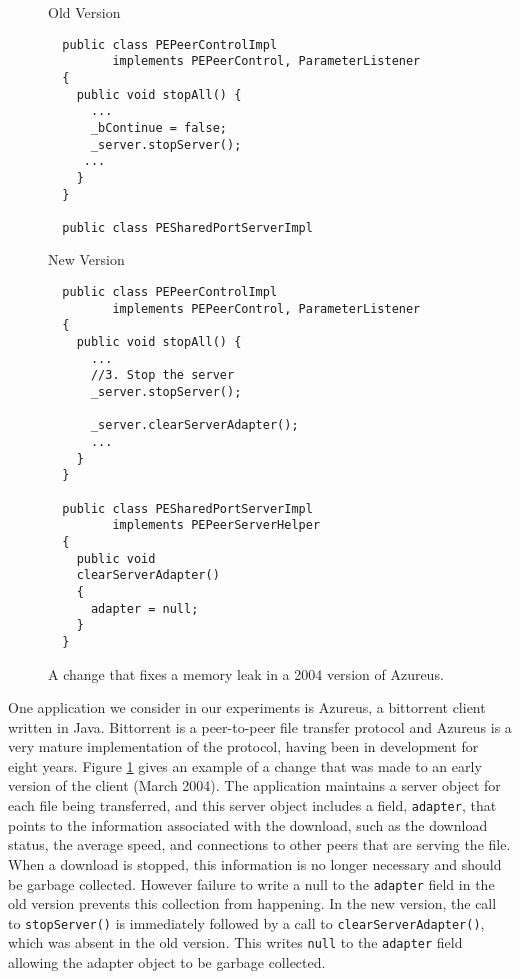 \begin{figure}
\begin{minipage}{\textwidth/2}
\begin{center}
Old Version
\end{center}
\begin{verbatim}
  public class PEPeerControlImpl
         implements PEPeerControl, ParameterListener
  {
    public void stopAll() {
      ...
      _bContinue = false;
      _server.stopServer();
     ...
    }
  }

  public class PESharedPortServerImpl

\end{verbatim}
\end{minipage}
\begin{minipage}{\textwidth/2}
\begin{center}
New Version
\end{center}
\begin{verbatim}
  public class PEPeerControlImpl
         implements PEPeerControl, ParameterListener
  {
    public void stopAll() {
      ...
      //3. Stop the server
      _server.stopServer();

      _server.clearServerAdapter();
      ...
    }
  }

  public class PESharedPortServerImpl
         implements PEPeerServerHelper
  {
    public void
    clearServerAdapter()
    {
      adapter = null;
    }
  }
\end{verbatim}
\end{minipage}
\caption{\label{fig:azureus-change}A change that fixes a memory leak in a 2004 version of Azureus.}
\end{figure}

One application we consider in our experiments is Azureus, a
bittorrent client written in Java.  Bittorrent is a peer-to-peer file
transfer protocol and Azureus is a very mature implementation of the
protocol, having been in development for eight years.  Figure
\ref{fig:azureus-change} gives an example of a change that was made to
an early version of the client (March 2004).  The application
maintains a server object for each file being transferred, and this
server object includes a field, \texttt{adapter}, that points to the
information associated with the download, such as the download status,
the average speed, and connections to other peers that are serving the
file.  When a download is stopped, this information is no longer
necessary and should be garbage collected.  However failure to write a
null to the \texttt{adapter} field in the old version prevents this
collection from happening.  In the new version, the call to
\texttt{stopServer()} is immediately followed by a call to
\texttt{clearServerAdapter()}, which was absent in the old version.
This writes \texttt{null} to the \texttt{adapter} field allowing the
adapter object to be garbage collected.

